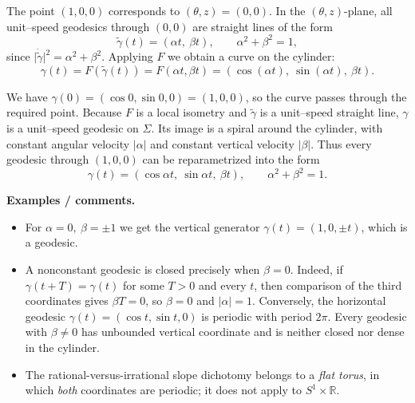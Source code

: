 \begin{solution}
The point $(1,0,0)$ corresponds to $(\theta,z)=(0,0)$.
	In the $(\theta,z)$-plane, all unit--speed geodesics through $(0,0)$ are straight
	lines of the form
	\[
	\widetilde\gamma(t) = (\alpha t,\ \beta t),
	\qquad \alpha^2+\beta^2=1,
	\]
	since $\lvert\dot{\widetilde\gamma}\rvert^2=\alpha^2+\beta^2$.
	Applying $F$ we obtain a curve on the cylinder:
	\[
	\gamma(t)=F(\widetilde\gamma(t))
	=F(\alpha t,\beta t)
	=(\cos(\alpha t),\ \sin(\alpha t),\ \beta t).
	\]
	
	We have $\gamma(0)=(\cos 0,\sin 0,0)=(1,0,0)$, so the curve passes through
	the required point. Because $F$ is a local isometry and $\widetilde\gamma$ is a
	unit--speed straight line, $\gamma$ is a unit--speed geodesic on $\Sigma$.
	Its image is a spiral around the cylinder, with constant angular velocity
	$\lvert\alpha\rvert$ and constant vertical velocity $\lvert\beta\rvert$.
	Thus every geodesic through $(1,0,0)$ can be reparametrized into the form
	\[
	\gamma(t)=(\cos\alpha t,\ \sin\alpha t,\ \beta t),
	\qquad \alpha^2+\beta^2=1.
	\]
	
	\medskip
	\textbf{Examples / comments.}
	\begin{itemize}
		\item For $\alpha=0,\ \beta=\pm1$ we get the vertical generator
		$\gamma(t)=(1,0,\pm t)$, which is a geodesic.
		\item A nonconstant geodesic is closed precisely when $\beta=0$.
		Indeed, if $\gamma(t+T)=\gamma(t)$ for some $T>0$ and every $t$,
		then comparison of the third coordinates gives $\beta T=0$,
		so $\beta=0$ and $|\alpha|=1$.  Conversely, the horizontal
		geodesic $\gamma(t)=(\cos t,\sin t,0)$ is periodic with period
		$2\pi$.  Every geodesic with $\beta\ne0$ has unbounded vertical
		coordinate and is neither closed nor dense in the cylinder.
		\item The rational-versus-irrational slope dichotomy belongs to a
		\emph{flat torus}, in which \emph{both} coordinates are periodic;
		it does not apply to $S^1\times\mathbb R$.
	\end{itemize}
	
\end{solution}

